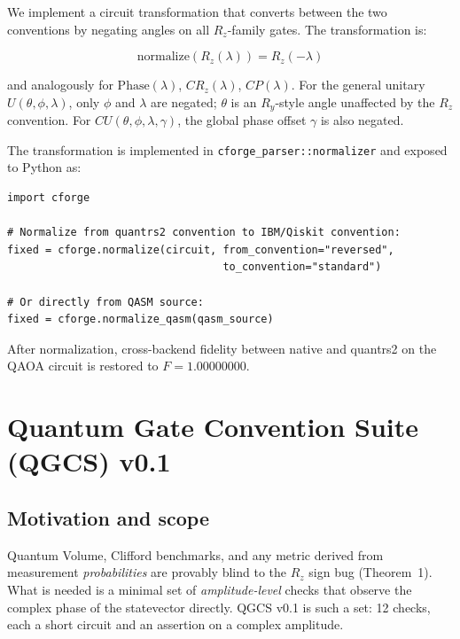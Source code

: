 \documentclass[11pt,a4paper]{article}
\begin{document}
We implement a circuit transformation that converts between the two conventions
by negating angles on all $R_z$-family gates. The transformation is:

\begin{equation}
  \text{normalize}(R_z(\lambda)) = R_z(-\lambda)
\end{equation}

and analogously for $\text{Phase}(\lambda)$, $CR_z(\lambda)$, $CP(\lambda)$.
For the general unitary $U(\theta, \phi, \lambda)$, only $\phi$ and $\lambda$
are negated; $\theta$ is an $R_y$-style angle unaffected by the $R_z$
convention. For $CU(\theta, \phi, \lambda, \gamma)$, the global phase offset
$\gamma$ is also negated.

The transformation is implemented in \texttt{cforge\_parser::normalizer} and
exposed to Python as:

\begin{lstlisting}[style=python, caption={Convention normalization in Python.}]
import cforge

# Normalize from quantrs2 convention to IBM/Qiskit convention:
fixed = cforge.normalize(circuit, from_convention="reversed",
                                  to_convention="standard")

# Or directly from QASM source:
fixed = cforge.normalize_qasm(qasm_source)
\end{lstlisting}

After normalization, cross-backend fidelity between native and quantrs2
on the QAOA circuit is restored to $F = 1.00000000$.

\section{Quantum Gate Convention Suite (QGCS) v0.1}

\subsection{Motivation and scope}

Quantum Volume, Clifford benchmarks, and any metric derived from measurement
\emph{probabilities} are provably blind to the $R_z$ sign bug (Theorem~1).
What is needed is a minimal set of \emph{amplitude-level} checks that observe
the complex phase of the statevector directly. QGCS v0.1 is such a set: 12
checks, each a short circuit and an assertion on a complex amplitude.
\end{document}
